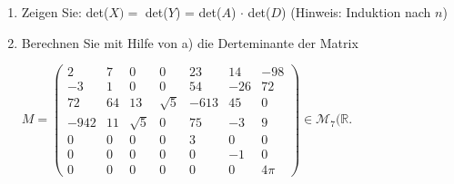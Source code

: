  \begin{enumerate}[label=\alph*)]
 \item Zeigen Sie: det($X) = $ det($Y$) = det($A$) $\cdot$ det($D$) (Hinweis: Induktion nach $n$)
 \item Berechnen Sie mit Hilfe von a) die Derteminante der Matrix\\
 \begin{center}
 $M = \begin{pmatrix}
 2&7&0&0&23&14&-98\\
 -3&1&0&0&54&-26&72\\
 72&64&13&\sqrt{5}&-613&45&0\\
 -942&11&\sqrt{5}&0&75&-3&9\\
 0&0&0&0&3&0&0\\
 0&0&0&0&0&-1&0 \\
  0&0&0&0&0&0&4\pi
 \end{pmatrix} \in \mathcal{M}_7(\mathbb{R}$.
 \end{center}
 
 \end{enumerate}